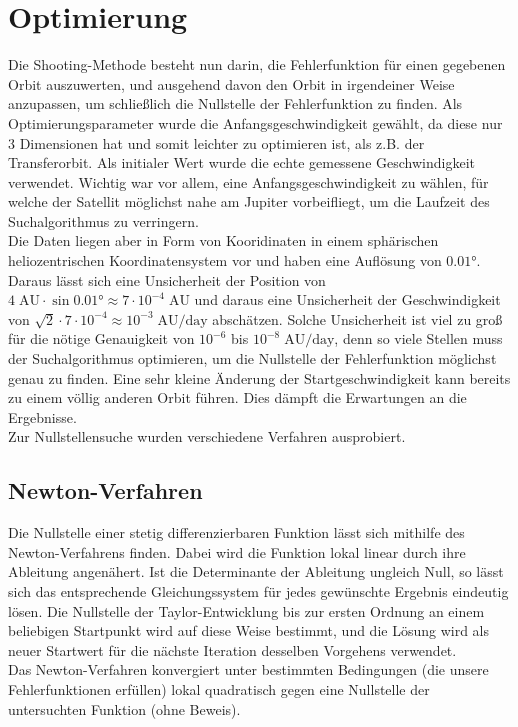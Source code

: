 \section{Optimierung}
Die Shooting-Methode besteht nun darin, die Fehlerfunktion für einen gegebenen Orbit auszuwerten, und ausgehend davon den Orbit in irgendeiner Weise anzupassen, um schließlich die Nullstelle der Fehlerfunktion zu finden.
Als Optimierungsparameter wurde die Anfangsgeschwindigkeit gewählt, da diese nur 3 Dimensionen hat und somit leichter zu optimieren ist, als z.B. der Transferorbit.
Als initialer Wert wurde die echte gemessene Geschwindigkeit verwendet. Wichtig war vor allem, eine Anfangsgeschwindigkeit zu wählen, für welche der Satellit möglichst nahe am Jupiter vorbeifliegt, um die Laufzeit des Suchalgorithmus zu verringern. \\
Die Daten liegen aber in Form von Kooridinaten in einem sphärischen heliozentrischen Koordinatensystem vor und haben eine Auflösung von $0.01\text{°}$.
Daraus lässt sich eine Unsicherheit der Position von $4\;\text{AU}\cdot\sin 0.01\text{°}\approx 7\cdot 10^{-4}\;\text{AU}$ und daraus eine Unsicherheit der Geschwindigkeit von $\sqrt{2}\cdot 7\cdot 10^{-4} \approx 10^{-3}\;\text{AU/day}$ abschätzen.
Solche Unsicherheit ist viel zu groß für die nötige Genauigkeit von $10^{-6}$ bis $10^{-8}\;\text{AU/day}$, denn so viele Stellen muss der Suchalgorithmus optimieren, um die Nullstelle der Fehlerfunktion möglichst genau zu finden. Eine sehr kleine Änderung der Startgeschwindigkeit kann bereits zu einem völlig anderen Orbit führen. Dies dämpft die Erwartungen an die Ergebnisse.\\
Zur Nullstellensuche wurden verschiedene Verfahren ausprobiert.

\subsection{Newton-Verfahren}

Die Nullstelle einer stetig differenzierbaren Funktion lässt sich mithilfe des Newton-Verfahrens finden. Dabei wird die Funktion lokal linear durch ihre Ableitung angenähert. Ist die Determinante der Ableitung ungleich Null, so lässt sich das entsprechende Gleichungssystem für jedes gewünschte Ergebnis eindeutig lösen. Die Nullstelle der Taylor-Entwicklung bis zur ersten Ordnung an einem beliebigen Startpunkt wird auf diese Weise bestimmt, und die Lösung wird als neuer Startwert für die nächste Iteration desselben Vorgehens verwendet. \\
Das Newton-Verfahren konvergiert unter bestimmten Bedingungen (die unsere Fehlerfunktionen erfüllen) lokal quadratisch gegen eine Nullstelle der untersuchten Funktion (ohne Beweis).

